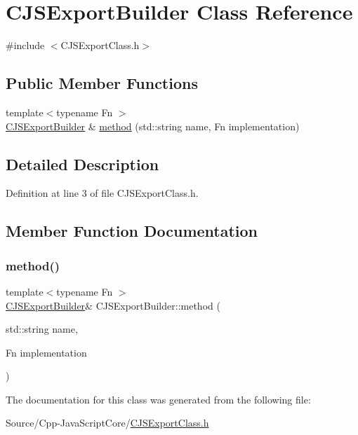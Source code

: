 \hypertarget{class_c_j_s_export_builder}{}\section{C\+J\+S\+Export\+Builder Class Reference}
\label{class_c_j_s_export_builder}


{\ttfamily \#include $<$C\+J\+S\+Export\+Class.\+h$>$}

\subsection*{Public Member Functions}
\begin{DoxyCompactItemize}
\item 
{\footnotesize template$<$typename Fn $>$ }\\\mbox{\hyperlink{class_c_j_s_export_builder}{C\+J\+S\+Export\+Builder}} \& \mbox{\hyperlink{class_c_j_s_export_builder_a2158c88394ce3ab2492a821659b18624}{method}} (std\+::string name, Fn implementation)
\end{DoxyCompactItemize}


\subsection{Detailed Description}


Definition at line 3 of file C\+J\+S\+Export\+Class.\+h.



\subsection{Member Function Documentation}
\mbox{\label{class_c_j_s_export_builder_a2158c88394ce3ab2492a821659b18624}} 
\subsubsection{\texorpdfstring{method()}{method()}}
{\footnotesize\ttfamily template$<$typename Fn $>$ \\
\mbox{\hyperlink{class_c_j_s_export_builder}{C\+J\+S\+Export\+Builder}}\& C\+J\+S\+Export\+Builder\+::method (\begin{DoxyParamCaption}\item[{std\+::string}]{name,  }\item[{Fn}]{implementation }\end{DoxyParamCaption})}



The documentation for this class was generated from the following file\+:\begin{DoxyCompactItemize}
\item 
Source/\+Cpp-\/\+Java\+Script\+Core/\mbox{\hyperlink{_c_j_s_export_class_8h}{C\+J\+S\+Export\+Class.\+h}}\end{DoxyCompactItemize}
